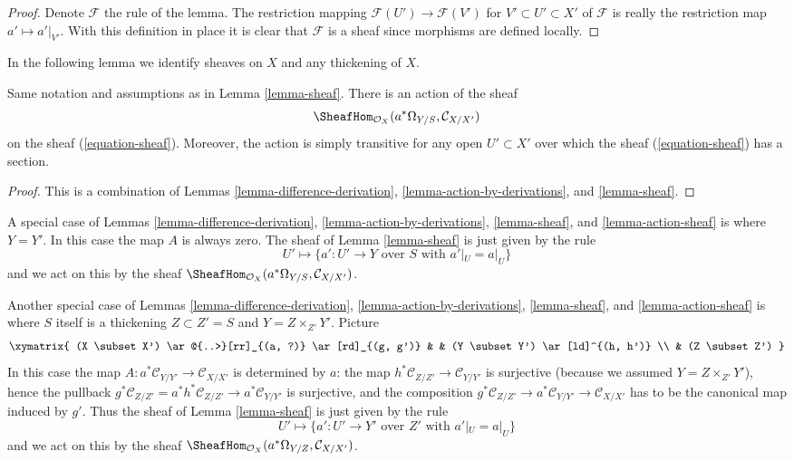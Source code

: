 \begin{proof}
Denote $\mathcal{F}$ the rule of the lemma.
The restriction mapping $\mathcal{F}(U') \to \mathcal{F}(V')$ for
$V' \subset U' \subset X'$
of $\mathcal{F}$ is really the restriction map $a' \mapsto a'|_{V'}$.
With this definition in place it is clear that $\mathcal{F}$ is a
sheaf since morphisms are defined locally.
\end{proof}

\noindent
In the following lemma we identify sheaves on $X$ and any thickening
of $X$.

\begin{lemma}
\label{lemma-action-sheaf}
Same notation and assumptions as in Lemma \ref{lemma-sheaf}.
There is an action of the sheaf
$$
\SheafHom_{\mathcal{O}_X}(a^*\Omega_{Y/S}, \mathcal{C}_{X/X'})
$$
on the sheaf (\ref{equation-sheaf}). Moreover, the action
is simply transitive for any open $U' \subset X'$ over which the sheaf
(\ref{equation-sheaf}) has a section.
\end{lemma}

\begin{proof}
This is a combination of
Lemmas \ref{lemma-difference-derivation},
\ref{lemma-action-by-derivations},
and \ref{lemma-sheaf}.
\end{proof}

\begin{remark}
\label{remark-special-case}
A special case of
Lemmas \ref{lemma-difference-derivation},
\ref{lemma-action-by-derivations},
\ref{lemma-sheaf}, and
\ref{lemma-action-sheaf}
is where $Y = Y'$. In this case the map $A$ is always zero.
The sheaf of
Lemma \ref{lemma-sheaf}
is just given by the rule
$$
U' \mapsto
\{a' : U' \to Y\text{ over }S\text{ with } a'|_U = a|_U\}
$$
and we act on this by the sheaf
$\SheafHom_{\mathcal{O}_X}(a^*\Omega_{Y/S}, \mathcal{C}_{X/X'})$.
\end{remark}

\begin{remark}
\label{remark-another-special-case}
Another special case of
Lemmas \ref{lemma-difference-derivation},
\ref{lemma-action-by-derivations},
\ref{lemma-sheaf}, and
\ref{lemma-action-sheaf}
is where $S$ itself is a thickening $Z \subset Z' = S$
and $Y = Z \times_{Z'} Y'$. Picture
$$
\xymatrix{
(X \subset X') \ar@{..>}[rr]_{(a, ?)} \ar[rd]_{(g, g')} & &
(Y \subset Y') \ar[ld]^{(h, h')} \\
& (Z \subset Z')
}
$$
In this case the map $A : a^*\mathcal{C}_{Y/Y'} \to \mathcal{C}_{X/X'}$
is determined by $a$: the map
$h^*\mathcal{C}_{Z/Z'} \to \mathcal{C}_{Y/Y'}$ is surjective (because
we assumed $Y = Z \times_{Z'} Y'$),
hence the pullback $g^*\mathcal{C}_{Z/Z'} = a^*h^*\mathcal{C}_{Z/Z'} \to
a^*\mathcal{C}_{Y/Y'}$ is surjective, and the composition
$g^*\mathcal{C}_{Z/Z'} \to a^*\mathcal{C}_{Y/Y'} \to \mathcal{C}_{X/X'}$
has to be the canonical map induced by $g'$. Thus the sheaf of
Lemma \ref{lemma-sheaf}
is just given by the rule
$$
U' \mapsto
\{a' : U' \to Y'\text{ over }Z'\text{ with } a'|_U = a|_U\}
$$
and we act on this by the sheaf
$\SheafHom_{\mathcal{O}_X}(a^*\Omega_{Y/Z}, \mathcal{C}_{X/X'})$.
\end{remark}

